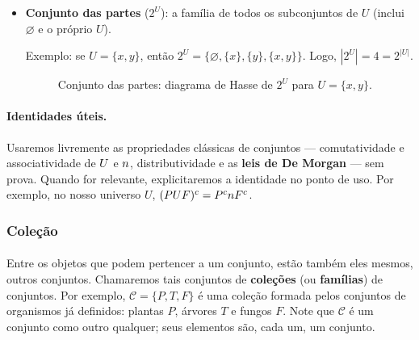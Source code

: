 \documentclass[12pt,a4paper]{article}
\def\cup{\string U}%
\def\cap{\string n}%
\begin{document}
\begin{itemize}
          \paragraph{}
    \item \textbf{Conjunto das partes} (\(2^U\)): a família de todos os subconjuntos de \(U\) (inclui \(\varnothing\) e o próprio \(U\)).

          Exemplo: se \(U = \{x,y\}\), então \(2^U = \{\varnothing, \{x\}, \{y\}, \{x,y\}\}\). Logo, \(|2^U|=4=2^{|U|}\).
          \begin{figure}[H]
              \centering
              \caption{Conjunto das partes: diagrama de Hasse de $2^{U}$ para $U=\{x,y\}$.}
              \label{fig:op-partes}
          \end{figure}
\end{itemize}

\paragraph{Identidades úteis.}
Usaremos livremente as propriedades clássicas de conjuntos — comutatividade e associatividade de \(\cup\) e \(\cap\), distributividade e as \textbf{leis de De Morgan} — sem prova. Quando for relevante, explicitaremos a identidade no ponto de uso. Por exemplo, no nosso universo \(U\), \((P\cup F)^c = P^c\cap F^c\).

\subsubsection{Coleção}

\paragraph{}
Entre os objetos que podem pertencer a um conjunto, estão também eles mesmos, outros conjuntos. Chamaremos tais conjuntos de \textbf{coleções} (ou \textbf{famílias}) de conjuntos. Por exemplo, \(\mathcal{C} = \{P, T, F\}\) é uma coleção formada pelos conjuntos de organismos já definidos: plantas \(P\), árvores \(T\) e fungos \(F\). Note que \(\mathcal{C}\) é um conjunto como outro qualquer; seus elementos são, cada um, um conjunto.
\end{document}
